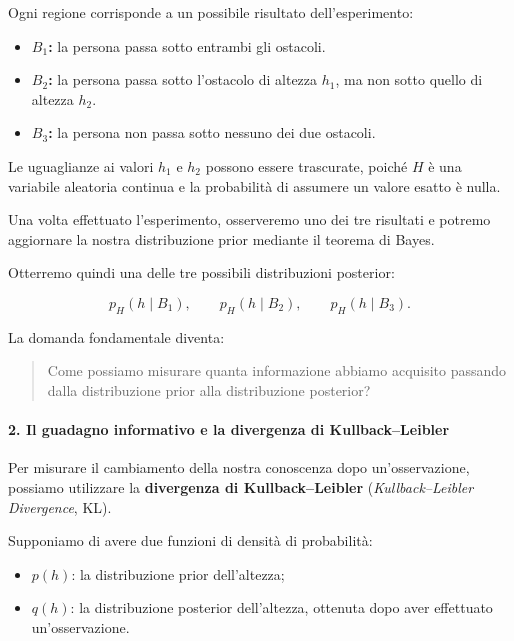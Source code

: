 Ogni regione corrisponde a un possibile risultato dell'esperimento:

\begin{itemize}
    \item \textbf{$B_1$:} la persona passa sotto entrambi gli ostacoli.
    \item \textbf{$B_2$:} la persona passa sotto l'ostacolo di altezza $h_1$, ma non sotto quello di altezza $h_2$.
    \item \textbf{$B_3$:} la persona non passa sotto nessuno dei due ostacoli.
\end{itemize}

Le uguaglianze ai valori $h_1$ e $h_2$ possono essere trascurate, poiché $H$ è una variabile aleatoria continua e la probabilità di assumere un valore esatto è nulla.

Una volta effettuato l'esperimento, osserveremo uno dei tre risultati e potremo aggiornare la nostra distribuzione prior mediante il teorema di Bayes.

Otterremo quindi una delle tre possibili distribuzioni posterior:

\begin{equation*}
    p_H(h\mid B_1),
    \qquad
    p_H(h\mid B_2),
    \qquad
    p_H(h\mid B_3).
\end{equation*}

La domanda fondamentale diventa:

\begin{quote}
    Come possiamo misurare quanta informazione abbiamo acquisito passando dalla distribuzione prior alla distribuzione posterior?
\end{quote}

\paragraph{2. Il guadagno informativo e la divergenza di Kullback--Leibler}

Per misurare il cambiamento della nostra conoscenza dopo un'osservazione, possiamo utilizzare la \textbf{divergenza di Kullback--Leibler} (\textit{Kullback--Leibler Divergence}, KL).

Supponiamo di avere due funzioni di densità di probabilità:

\begin{itemize}
    \item $p(h)$: la distribuzione prior dell'altezza;
    \item $q(h)$: la distribuzione posterior dell'altezza, ottenuta dopo aver effettuato un'osservazione.
\end{itemize}

